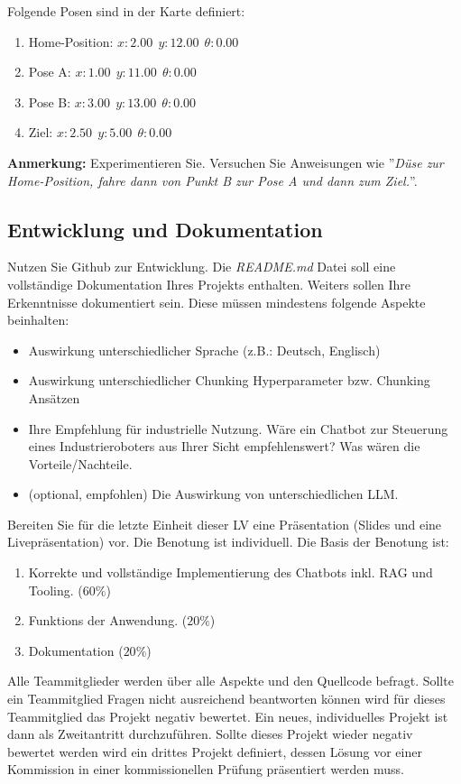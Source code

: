 \documentclass{article}
\begin{document}
Folgende Posen sind in der Karte definiert:

\begin{enumerate}
\item Home-Position: $x: 2.00 \ \  y: 12.00 \ \ \theta: 0.00$
\item Pose A: $x: 1.00 \ \  y: 11.00 \ \ \theta: 0.00$
\item Pose B: $x: 3.00 \ \  y: 13.00 \ \ \theta: 0.00$
\item Ziel: $x: 2.50 \ \  y: 5.00 \ \ \theta: 0.00$
\end{enumerate}

\textbf{Anmerkung:} Experimentieren Sie. Versuchen Sie Anweisungen wie ''\textit{Düse zur Home-Position, fahre dann von Punkt B zur Pose A und dann zum Ziel.}''. 

\subsection{Entwicklung und Dokumentation}
Nutzen Sie Github zur Entwicklung.
Die \textit{README.md} Datei soll eine vollständige Dokumentation Ihres Projekts enthalten.
Weiters sollen Ihre Erkenntnisse dokumentiert sein. 
Diese müssen mindestens folgende Aspekte beinhalten:
\begin{itemize}
    \item Auswirkung unterschiedlicher Sprache (z.B.: Deutsch, Englisch)
    \item Auswirkung unterschiedlicher Chunking Hyperparameter bzw. Chunking Ansätzen
    \item Ihre Empfehlung für industrielle Nutzung. Wäre ein Chatbot zur Steuerung eines Industrieroboters aus Ihrer Sicht empfehlenswert? Was wären die Vorteile/Nachteile.
    \item (optional, empfohlen) Die Auswirkung von unterschiedlichen LLM.
\end{itemize}

Bereiten Sie für die letzte Einheit dieser LV eine Präsentation (Slides und eine Livepräsentation) vor. 
Die Benotung ist individuell. 
Die Basis der Benotung ist:
\begin{enumerate}
    \item Korrekte und vollständige Implementierung des Chatbots inkl. RAG und Tooling. ($60\%$)
    \item Funktions der Anwendung. ($20\%$)
    \item Dokumentation ($20\%$)
\end{enumerate}
Alle Teammitglieder werden über alle Aspekte und den Quellcode befragt. 
Sollte ein Teammitglied Fragen nicht ausreichend beantworten können wird für dieses Teammitglied das Projekt negativ bewertet. 
Ein neues, individuelles Projekt ist dann als Zweitantritt durchzuführen.
Sollte dieses Projekt wieder negativ bewertet werden wird ein drittes Projekt definiert, dessen Lösung vor einer Kommission in einer kommissionellen Prüfung präsentiert werden muss.
\end{document}
